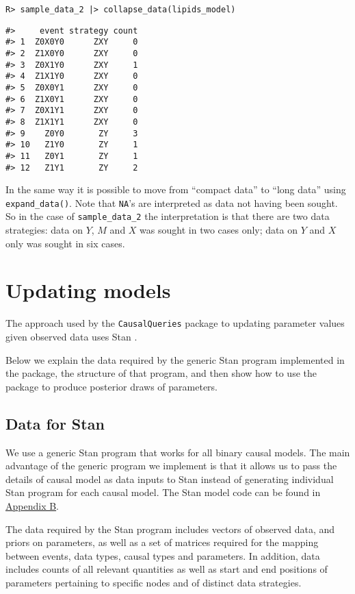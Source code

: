 \documentclass[
  11pt,
  article]{jss}
\begin{document}
\begin{verbatim}
R> sample_data_2 |> collapse_data(lipids_model)
\end{verbatim}

\begin{verbatim}
#>     event strategy count
#> 1  Z0X0Y0      ZXY     0
#> 2  Z1X0Y0      ZXY     0
#> 3  Z0X1Y0      ZXY     1
#> 4  Z1X1Y0      ZXY     0
#> 5  Z0X0Y1      ZXY     0
#> 6  Z1X0Y1      ZXY     0
#> 7  Z0X1Y1      ZXY     0
#> 8  Z1X1Y1      ZXY     0
#> 9    Z0Y0       ZY     3
#> 10   Z1Y0       ZY     1
#> 11   Z0Y1       ZY     1
#> 12   Z1Y1       ZY     2
\end{verbatim}

In the same way it is possible to move from ``compact data'' to ``long
data'' using \texttt{expand\_data()}. Note that \texttt{NA}'s are
interpreted as data not having been sought. So in the case of
\texttt{sample\_data\_2} the interpretation is that there are two data
strategies: data on \(Y\), \(M\) and \(X\) was sought in two cases only;
data on \(Y\) and \(X\) only was sought in six cases.

\hypertarget{sec-update}{%
\section{Updating models}\label{sec-update}}

The approach used by the \texttt{CausalQueries} package to updating
parameter values given observed data uses Stan
\citep{carpenter_stan_2017}.

Below we explain the data required by the generic Stan program
implemented in the package, the structure of that program, and then show
how to use the package to produce posterior draws of parameters.

\hypertarget{data-for-stan}{%
\subsection{Data for Stan}\label{data-for-stan}}

We use a generic Stan program that works for all binary causal models.
The main advantage of the generic program we implement is that it allows
us to pass the details of causal model as data inputs to Stan instead of
generating individual Stan program for each causal model. The Stan model
code can be found in \protect\hyperlink{sec-stancode}{Appendix B}.

The data required by the Stan program includes vectors of observed data,
and priors on parameters, as well as a set of matrices required for the
mapping between events, data types, causal types and parameters. In
addition, data includes counts of all relevant quantities as well as
start and end positions of parameters pertaining to specific nodes and
of distinct data strategies.
\end{document}
